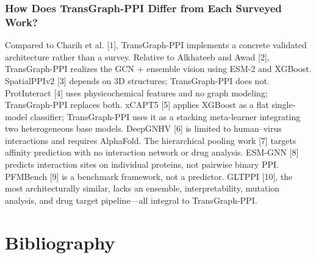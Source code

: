 \documentclass[12pt,a4paper]{report}
\begin{document}
\subsection{How Does TransGraph-PPI Differ from Each Surveyed Work?}
Compared to Charih et al. [1], TransGraph-PPI implements a concrete validated architecture rather than a survey. Relative to Alkhateeb and Awad [2], TransGraph-PPI realizes the GCN + ensemble vision using ESM-2 and XGBoost. SpatialPPIv2 [3] depends on 3D structures; TransGraph-PPI does not. ProtInteract [4] uses physicochemical features and no graph modeling; TransGraph-PPI replaces both. xCAPT5 [5] applies XGBoost as a flat single-model classifier; TransGraph-PPI uses it as a stacking meta-learner integrating two heterogeneous base models. DeepGNHV [6] is limited to human–virus interactions and requires AlphaFold. The hierarchical pooling work [7] targets affinity prediction with no interaction network or drug analysis. ESM-GNN [8] predicts interaction sites on individual proteins, not pairwise binary PPI. PFMBench [9] is a benchmark framework, not a predictor. GLTPPI [10], the most architecturally similar, lacks an ensemble, interpretability, mutation analysis, and drug target pipeline—all integral to TransGraph-PPI.

\newpage

\chapter*{Bibliography}
\end{document}
